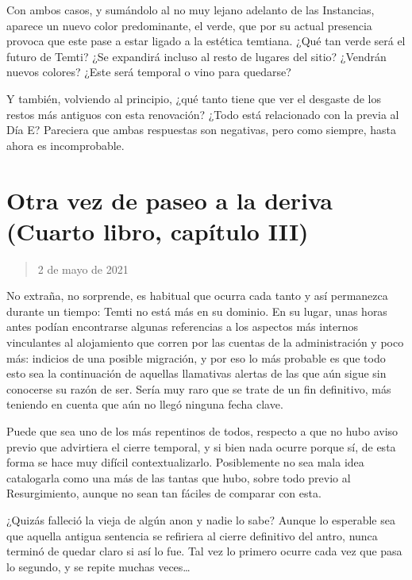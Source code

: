\documentclass[
  spanish,
]{book}
\begin{document}
Con ambos casos, y sumándolo al no muy lejano adelanto de las Instancias, aparece un nuevo color predominante, el verde, que por su actual presencia provoca que este pase a estar ligado a la estética temtiana. ¿Qué tan verde será el futuro de Temti? ¿Se expandirá incluso al resto de lugares del sitio? ¿Vendrán nuevos colores? ¿Este será temporal o vino para quedarse?

Y también, volviendo al principio, ¿qué tanto tiene que ver el desgaste de los restos más antiguos con esta renovación? ¿Todo está relacionado con la previa al Día E? Pareciera que ambas respuestas son negativas, pero como siempre, hasta ahora es incomprobable.

\hypertarget{otra-vez-de-paseo-a-la-deriva-cuarto-libro-capuxedtulo-iii}{%
\section{Otra vez de paseo a la deriva (Cuarto libro, capítulo III)}\label{otra-vez-de-paseo-a-la-deriva-cuarto-libro-capuxedtulo-iii}}

\begin{quote}
2 de mayo de 2021
\end{quote}

No extraña, no sorprende, es habitual que ocurra cada tanto y así permanezca durante un tiempo: Temti no está más en su dominio. En su lugar, unas horas antes podían encontrarse algunas referencias a los aspectos más internos vinculantes al alojamiento que corren por las cuentas de la administración y poco más: indicios de una posible migración, y por eso lo más probable es que todo esto sea la continuación de aquellas llamativas alertas de las que aún sigue sin conocerse su razón de ser. Sería muy raro que se trate de un fin definitivo, más teniendo en cuenta que aún no llegó ninguna fecha clave.

Puede que sea uno de los más repentinos de todos, respecto a que no hubo aviso previo que advirtiera el cierre temporal, y si bien nada ocurre porque sí, de esta forma se hace muy difícil contextualizarlo. Posiblemente no sea mala idea catalogarla como una más de las tantas que hubo, sobre todo previo al Resurgimiento, aunque no sean tan fáciles de comparar con esta.

¿Quizás falleció la vieja de algún anon y nadie lo sabe? Aunque lo esperable sea que aquella antigua sentencia se refiriera al cierre definitivo del antro, nunca terminó de quedar claro si así lo fue. Tal vez lo primero ocurre cada vez que pasa lo segundo, y se repite muchas veces\ldots{}
\end{document}
